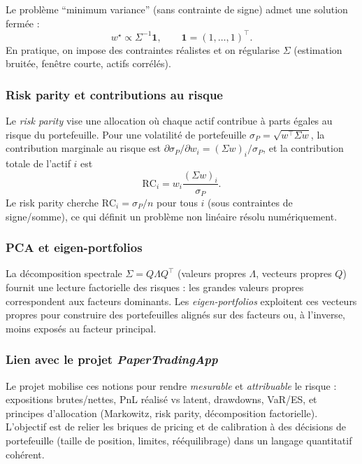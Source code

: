 \documentclass[11pt,a4paper]{article}
\newcommand{\1}{\mathbf{1}}
\begin{document}
Le probl\`eme ``minimum variance'' (sans contrainte de signe) admet une solution ferm\'ee :
\[
w^\star \propto \Sigma^{-1}\mathbf{1},\qquad
\mathbf{1}=(1,\dots,1)^\top.
\]
En pratique, on impose des contraintes r\'ealistes et on r\'egularise $\Sigma$ (estimation bruit\'ee, fen\^etre courte,
actifs corr\'el\'es).

\subsubsection{Risk parity et contributions au risque}

Le \emph{risk parity} vise une allocation o\`u chaque actif contribue \`a parts \'egales au risque du portefeuille.
Pour une volatilité de portefeuille $\sigma_P=\sqrt{w^\top\Sigma w}$, la contribution marginale au risque est
$\partial\sigma_P/\partial w_i = (\Sigma w)_i/\sigma_P$, et la contribution totale de l'actif $i$ est
\[
\mathrm{RC}_i = w_i \frac{(\Sigma w)_i}{\sigma_P}.
\]
Le risk parity cherche $\mathrm{RC}_i=\sigma_P/n$ pour tous $i$ (sous contraintes de signe/somme), ce qui d\'efinit un
probl\`eme non lin\'eaire r\'esolu num\'eriquement.

\subsubsection{PCA et eigen-portfolios}

La d\'ecomposition spectrale $\Sigma = Q\Lambda Q^\top$ (valeurs propres $\Lambda$, vecteurs propres $Q$) fournit une
lecture factorielle des risques : les grandes valeurs propres correspondent aux facteurs dominants. Les
\emph{eigen-portfolios} exploitent ces vecteurs propres pour construire des portefeuilles align\'es sur des facteurs
ou, \`a l'inverse, moins expos\'es au facteur principal.

\subsubsection{Lien avec le projet \emph{PaperTradingApp}}

Le projet mobilise ces notions pour rendre \emph{mesurable} et \emph{attribuable} le risque : expositions brutes/nettes, PnL r\'ealis\'e vs latent,
drawdowns, VaR/ES, et principes d'allocation (Markowitz, risk parity, d\'ecomposition factorielle). L'objectif est de relier les briques de pricing
et de calibration \`a des d\'ecisions de portefeuille (taille de position, limites, r\'e\'equilibrage) dans un langage quantitatif coh\'erent.
\end{document}

